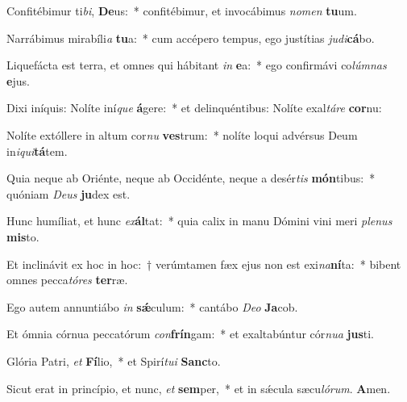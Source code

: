 \item Confitébimur ti\textit{bi}, \textbf{De}us:~* confitébimur, et invocábimus \textit{no}\textit{men} \textbf{tu}um.
\item Narrábimus mirabíli\textit{a} \textbf{tu}a:~* cum accépero tempus, ego justítias \textit{ju}\textit{di}\textbf{cá}bo.
\item Liquefácta est terra, et omnes qui hábitant \textit{in} \textbf{e}a:~* ego confirmávi co\textit{lúm}\textit{nas} \textbf{e}jus.
\item Dixi iníquis: Nolíte iní\textit{que} \textbf{á}gere:~* et delinquéntibus: Nolíte exal\textit{tá}\textit{re} \textbf{cor}nu:
\item Nolíte extóllere in altum cor\textit{nu} \textbf{ves}trum:~* nolíte loqui advérsus Deum in\textit{i}\textit{qui}\textbf{tá}tem.
\item Quia neque ab Oriénte, neque ab Occidénte, neque a desér\textit{tis} \textbf{món}tibus:~* quóniam \textit{De}\textit{us} \textbf{ju}dex est.
\item Hunc humíliat, et hunc \textit{ex}\textbf{ál}tat:~* quia calix in manu Dómini vini meri \textit{ple}\textit{nus} \textbf{mis}to.
\item Et inclinávit ex hoc in hoc:~† verúmtamen fæx ejus non est exi\textit{na}\textbf{ní}ta:~* bibent omnes pecca\textit{tó}\textit{res} \textbf{ter}ræ.
\item Ego autem annuntiábo \textit{in} \textbf{sǽ}culum:~* cantábo \textit{De}\textit{o} \textbf{Ja}cob.
\item Et ómnia córnua peccatórum \textit{con}\textbf{frín}gam:~* et exaltabúntur cór\textit{nu}\textit{a} \textbf{jus}ti.
\item Glória Patri, \textit{et} \textbf{Fí}lio,~* et Spirí\textit{tu}\textit{i} \textbf{Sanc}to.
\item Sicut erat in princípio, et nunc, \textit{et} \textbf{sem}per,~* et in sǽcula sæcu\textit{ló}\textit{rum}. \textbf{A}men.
